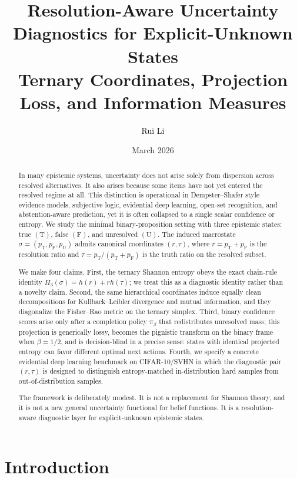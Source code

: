 \documentclass[11pt]{article}
\title{Resolution-Aware Uncertainty Diagnostics for Explicit-Unknown States\\
\large Ternary Coordinates, Projection Loss, and Information Measures}
\author{Rui Li}
\date{March 2026}
\newcommand{\T}{\mathrm{T}}
\newcommand{\F}{\mathrm{F}}
\newcommand{\U}{\mathrm{U}}
\newcommand{\1}{\mathbf{1}}
\begin{document}
\maketitle

\begin{abstract}
In many epistemic systems, uncertainty does not arise solely from dispersion across resolved alternatives. It also arises because some items have not yet entered the resolved regime at all. This distinction is operational in Dempster--Shafer style evidence models, subjective logic, evidential deep learning, open-set recognition, and abstention-aware prediction, yet it is often collapsed to a single scalar confidence or entropy. We study the minimal binary-proposition setting with three epistemic states: true $(\T)$, false $(\F)$, and unresolved $(\U)$. The induced macrostate $\sigma=(p_\T,p_\F,p_\U)$ admits canonical coordinates $(r,\tau)$, where $r=p_\T+p_\F$ is the resolution ratio and $\tau=p_\T/(p_\T+p_\F)$ is the truth ratio on the resolved subset. 

We make four claims. First, the ternary Shannon entropy obeys the exact chain-rule identity $H_3(\sigma)=h(r)+r h(\tau)$; we treat this as a diagnostic identity rather than a novelty claim. Second, the same hierarchical coordinates induce equally clean decompositions for Kullback--Leibler divergence and mutual information, and they diagonalize the Fisher--Rao metric on the ternary simplex. Third, binary confidence scores arise only after a completion policy $\pi_\beta$ that redistributes unresolved mass; this projection is generically lossy, becomes the pignistic transform on the binary frame when $\beta=1/2$, and is decision-blind in a precise sense: states with identical projected entropy can favor different optimal next actions. Fourth, we specify a concrete evidential deep learning benchmark on CIFAR-10/SVHN in which the diagnostic pair $(r,\tau)$ is designed to distinguish entropy-matched in-distribution hard samples from out-of-distribution samples.

The framework is deliberately modest. It is not a replacement for Shannon theory, and it is not a new general uncertainty functional for belief functions. It is a resolution-aware diagnostic layer for explicit-unknown epistemic states.
\end{abstract}

\section{Introduction}
\end{document}
